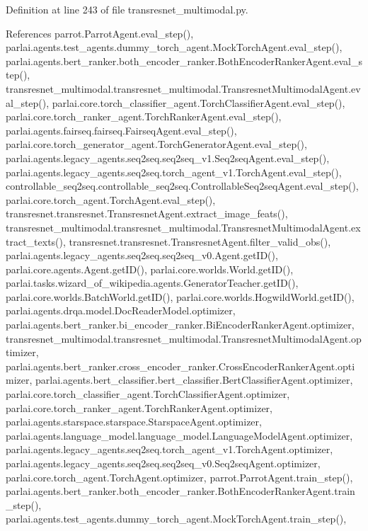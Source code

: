 Definition at line 243 of file transresnet\+\_\+multimodal.\+py.



References parrot.\+Parrot\+Agent.\+eval\+\_\+step(), parlai.\+agents.\+test\+\_\+agents.\+dummy\+\_\+torch\+\_\+agent.\+Mock\+Torch\+Agent.\+eval\+\_\+step(), parlai.\+agents.\+bert\+\_\+ranker.\+both\+\_\+encoder\+\_\+ranker.\+Both\+Encoder\+Ranker\+Agent.\+eval\+\_\+step(), transresnet\+\_\+multimodal.\+transresnet\+\_\+multimodal.\+Transresnet\+Multimodal\+Agent.\+eval\+\_\+step(), parlai.\+core.\+torch\+\_\+classifier\+\_\+agent.\+Torch\+Classifier\+Agent.\+eval\+\_\+step(), parlai.\+core.\+torch\+\_\+ranker\+\_\+agent.\+Torch\+Ranker\+Agent.\+eval\+\_\+step(), parlai.\+agents.\+fairseq.\+fairseq.\+Fairseq\+Agent.\+eval\+\_\+step(), parlai.\+core.\+torch\+\_\+generator\+\_\+agent.\+Torch\+Generator\+Agent.\+eval\+\_\+step(), parlai.\+agents.\+legacy\+\_\+agents.\+seq2seq.\+seq2seq\+\_\+v1.\+Seq2seq\+Agent.\+eval\+\_\+step(), parlai.\+agents.\+legacy\+\_\+agents.\+seq2seq.\+torch\+\_\+agent\+\_\+v1.\+Torch\+Agent.\+eval\+\_\+step(), controllable\+\_\+seq2seq.\+controllable\+\_\+seq2seq.\+Controllable\+Seq2seq\+Agent.\+eval\+\_\+step(), parlai.\+core.\+torch\+\_\+agent.\+Torch\+Agent.\+eval\+\_\+step(), transresnet.\+transresnet.\+Transresnet\+Agent.\+extract\+\_\+image\+\_\+feats(), transresnet\+\_\+multimodal.\+transresnet\+\_\+multimodal.\+Transresnet\+Multimodal\+Agent.\+extract\+\_\+texts(), transresnet.\+transresnet.\+Transresnet\+Agent.\+filter\+\_\+valid\+\_\+obs(), parlai.\+agents.\+legacy\+\_\+agents.\+seq2seq.\+seq2seq\+\_\+v0.\+Agent.\+get\+I\+D(), parlai.\+core.\+agents.\+Agent.\+get\+I\+D(), parlai.\+core.\+worlds.\+World.\+get\+I\+D(), parlai.\+tasks.\+wizard\+\_\+of\+\_\+wikipedia.\+agents.\+Generator\+Teacher.\+get\+I\+D(), parlai.\+core.\+worlds.\+Batch\+World.\+get\+I\+D(), parlai.\+core.\+worlds.\+Hogwild\+World.\+get\+I\+D(), parlai.\+agents.\+drqa.\+model.\+Doc\+Reader\+Model.\+optimizer, parlai.\+agents.\+bert\+\_\+ranker.\+bi\+\_\+encoder\+\_\+ranker.\+Bi\+Encoder\+Ranker\+Agent.\+optimizer, transresnet\+\_\+multimodal.\+transresnet\+\_\+multimodal.\+Transresnet\+Multimodal\+Agent.\+optimizer, parlai.\+agents.\+bert\+\_\+ranker.\+cross\+\_\+encoder\+\_\+ranker.\+Cross\+Encoder\+Ranker\+Agent.\+optimizer, parlai.\+agents.\+bert\+\_\+classifier.\+bert\+\_\+classifier.\+Bert\+Classifier\+Agent.\+optimizer, parlai.\+core.\+torch\+\_\+classifier\+\_\+agent.\+Torch\+Classifier\+Agent.\+optimizer, parlai.\+core.\+torch\+\_\+ranker\+\_\+agent.\+Torch\+Ranker\+Agent.\+optimizer, parlai.\+agents.\+starspace.\+starspace.\+Starspace\+Agent.\+optimizer, parlai.\+agents.\+language\+\_\+model.\+language\+\_\+model.\+Language\+Model\+Agent.\+optimizer, parlai.\+agents.\+legacy\+\_\+agents.\+seq2seq.\+torch\+\_\+agent\+\_\+v1.\+Torch\+Agent.\+optimizer, parlai.\+agents.\+legacy\+\_\+agents.\+seq2seq.\+seq2seq\+\_\+v0.\+Seq2seq\+Agent.\+optimizer, parlai.\+core.\+torch\+\_\+agent.\+Torch\+Agent.\+optimizer, parrot.\+Parrot\+Agent.\+train\+\_\+step(), parlai.\+agents.\+bert\+\_\+ranker.\+both\+\_\+encoder\+\_\+ranker.\+Both\+Encoder\+Ranker\+Agent.\+train\+\_\+step(), parlai.\+agents.\+test\+\_\+agents.\+dummy\+\_\+torch\+\_\+agent.\+Mock\+Torch\+Agent.\+train\+\_\+step(), 